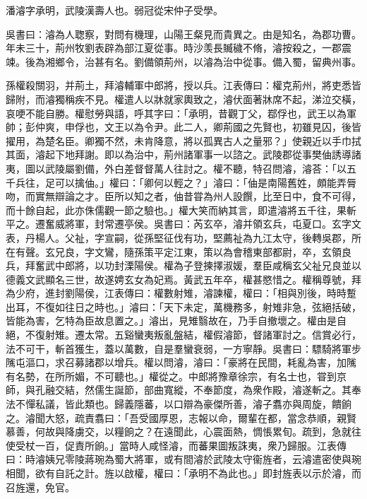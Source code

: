 
\begin{pinyinscope}
潘濬字承明，武陵漢壽人也。弱冠從宋仲子受學。

吳書曰：濬為人聦察，對問有機理，山陽王粲見而貴異之。由是知名，為郡功曹。年未三十，荊州牧劉表辟為部江夏從事。時沙羡長贓穢不脩，濬按殺之，一郡震竦。後為湘鄉令，治甚有名。劉備領荊州，以濬為治中從事。備入蜀，留典州事。

孫權殺關羽，并荊土，拜濬輔軍中郎將，授以兵。江表傳曰：權克荊州，將吏悉皆歸附，而濬獨稱疾不見。權遣人以牀就家輿致之，濬伏面著牀席不起，涕泣交橫，哀哽不能自勝。權慰勞與語，呼其字曰：「承明，昔觀丁父，鄀俘也，武王以為軍帥；彭仲爽，申俘也，文王以為令尹。此二人，卿荊國之先賢也，初雖見囚，後皆擢用，為楚名臣。卿獨不然，未肯降意，將以孤異古人之量邪？」使親近以手巾拭其面，濬起下地拜謝。即以為治中，荊州諸軍事一以諮之。武陵郡從事樊伷誘導諸夷，圖以武陵屬劉備，外白差督督萬人往討之。權不聽，特召問濬，濬荅：「以五千兵往，足可以擒伷。」權曰：「卿何以輕之？」濬曰：「伷是南陽舊姓，頗能弄脣吻，而實無辯論之才。臣所以知之者，伷昔甞為州人設饌，比至日中，食不可得，而十餘自起，此亦侏儒觀一節之驗也。」權大笑而納其言，即遣濬將五千往，果斬平之。遷奮威將軍，封常遷亭侯。吳書曰：芮玄卒，濬并領玄兵，屯夏口。玄字文表，丹楊人。父祉，字宣嗣，從孫堅征伐有功，堅薦祉為九江太守，後轉吳郡，所在有聲。玄兄良，字文鸞，隨孫策平定江東，策以為會稽東部都尉，卒，玄領良兵，拜奮武中郎將，以功封溧陽侯。權為子登揀擇淑媛，羣臣咸稱玄父祉兄良並以德義文武顯名三世，故遂娉玄女為妃焉。黃武五年卒，權甚愍惜之。權稱尊號，拜為少府，進封劉陽侯，江表傳曰：權數射雉，濬諫權，權曰：「相與別後，時時蹔出耳，不復如往日之時也。」濬曰：「天下未定，萬機務多，射雉非急，弦絕括破，皆能為害，乞特為臣故息置之。」濬出，見雉翳故在，乃手自撤壞之。權由是自絕，不復射雉。遷太常。五谿蠻夷叛亂盤結，權假濬節，督諸軍討之。信賞必行，法不可干，斬首獲生，蓋以萬數，自是羣蠻衰弱，一方寧靜。吳書曰：驃騎將軍步隲屯漚口，求召募諸郡以增兵。權以問濬，濬曰：「豪將在民間，耗亂為害，加隲有名勢，在所所媚，不可聽也。」權從之。中郎將豫章徐宗，有名士也，甞到京師，與孔融交結，然儒生誕節，部曲寬縱，不奉節度，為衆作殿，濬遂斬之。其奉法不憚私議，皆此類也。歸義隱蕃，以口辯為豪傑所善，濬子翥亦與周旋，饋餉之。濬聞大怒，疏責翥曰：「吾受國厚恩，志報以命，爾輩在都，當念恭順，親賢慕善，何故與降虜交，以糧餉之？在遠聞此，心震面熱，惆悵累旬。疏到，急就往使受杖一百，促責所餉。」當時人咸怪濬，而蕃果圖叛誅夷，衆乃歸服。江表傳曰：時濬姨兄零陵蔣琬為蜀大將軍，或有間濬於武陵太守衞旌者，云濬遣密使與琬相聞，欲有自託之計。旌以啟權，權曰：「承明不為此也。」即封旌表以示於濬，而召旌還，免官。


\end{pinyinscope}
